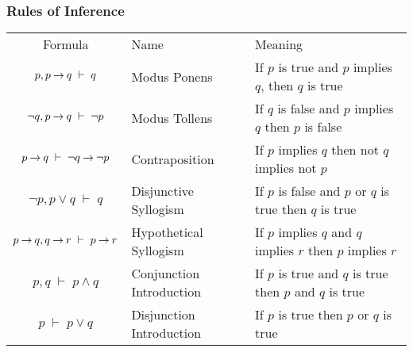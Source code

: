 \subsubsection{Rules of Inference}


\medskip
\begin{tabular}{c l l}
\label{Tab:RulesOfInference}
  Formula          & Name                  & Meaning      \\
  
  $p, p \mathbin{\rightarrow} q \;\vdash\; q$                                  & 
  Modus Ponens                                                  & 
  If $p$ is true and $p$ implies $q$, then $q$ is true          \\   
  
  $\neg q, p \mathbin{\rightarrow} q \;\vdash\; \neg p$                        & 
  Modus Tollens                                                 & 
  If $q$ is false and $p$ implies $q$ then $p$ is false         \\     
  
  $p \mathbin{\rightarrow} q \;\vdash\; \neg q \mathbin{\rightarrow} \neg p$                   & 
  Contraposition                                                & 
  If $p$ implies $q$ then not $q$ implies not $p$               \\   
  
  $\neg p, p \vee q \;\vdash\; q$                              & 
  Disjunctive Syllogism                                         & 
  If $p$ is false and $p$ or $q$ is true then $q$ is true       \\ 
  
  $p \mathbin{\rightarrow} q,  q \mathbin{\rightarrow} r \;\vdash\; p \mathbin{\rightarrow} r$                 & 
  Hypothetical Syllogism                                        & 
  If $p$ implies $q$ and $q$ implies $r$ then $p$ implies $r$   \\   
  
  $p,q \;\vdash\; p \wedge q$                                  & 
  Conjunction Introduction                                      & 
  If $p$ is true and $q$ is true then $p$ and $q$ is true       \\ 
  
  $p \;\vdash\; p \vee q$                                      & 
  Disjunction Introduction                                      & 
  If $p$ is true then $p$ or $q$ is true                        \\    
  

\end{tabular}

